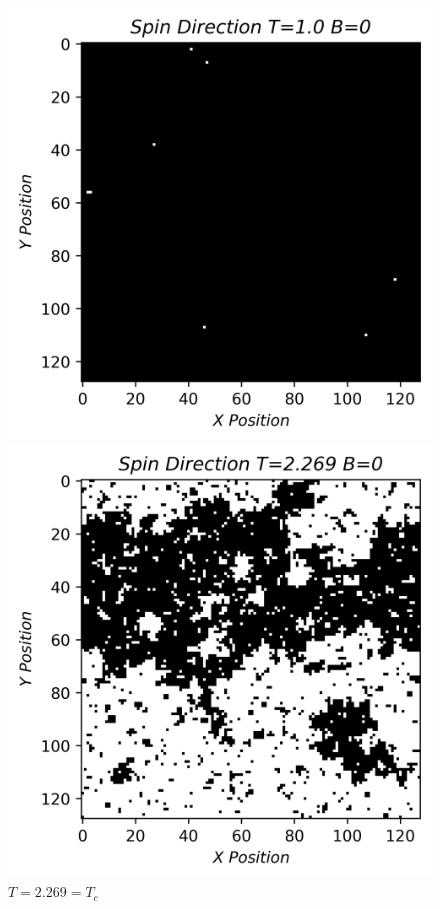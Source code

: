 \documentclass[twocolumn]{article}
\begin{document}
\begin{figure}[H]
\caption{$T=1\ll =T_c$}
\centering
\includegraphics[scale=.6]{SpinsT=1B=0}
\caption{$T=2.269=T_c$ }
\centering
\includegraphics[scale=.6]{SpinsT=2269B=0}

\end{figure}
\end{document}
